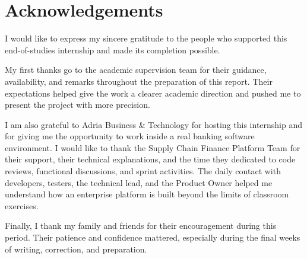 \chapter*{Acknowledgements}

I would like to express my sincere gratitude to the people who supported this end-of-studies internship and made its completion possible.

My first thanks go to the academic supervision team for their guidance, availability, and remarks throughout the preparation of this report. Their expectations helped give the work a clearer academic direction and pushed me to present the project with more precision.

I am also grateful to Adria Business \& Technology for hosting this internship and for giving me the opportunity to work inside a real banking software environment. I would like to thank the Supply Chain Finance Platform Team for their support, their technical explanations, and the time they dedicated to code reviews, functional discussions, and sprint activities. The daily contact with developers, testers, the technical lead, and the Product Owner helped me understand how an enterprise platform is built beyond the limits of classroom exercises.

Finally, I thank my family and friends for their encouragement during this period. Their patience and confidence mattered, especially during the final weeks of writing, correction, and preparation.


